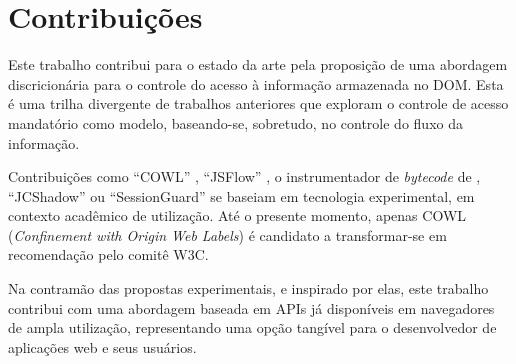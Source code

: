 \section{Contribuições}

Este trabalho contribui para o estado da arte pela proposição de uma abordagem discricionária para o controle do acesso à informação armazenada no DOM. Esta é uma trilha divergente de trabalhos anteriores que exploram o controle de acesso mandatório como modelo, baseando-se, sobretudo, no controle do fluxo da informação.

Contribuições como ``COWL'' \cite{Stefan2014}, ``JSFlow'' \cite{Hedin2016}, o instrumentador de \textit{bytecode} de \cite{Bichhawat2014}, ``JCShadow'' \cite{Patil2011} ou ``SessionGuard'' \cite{Patil2017} se baseiam em tecnologia experimental, em contexto acadêmico de utilização. Até o presente momento, apenas COWL (\textit{Confinement with Origin Web Labels}) é candidato a transformar-se em recomendação pelo comitê W3C\cite{W3C:COWL}.

Na contramão das propostas experimentais, e inspirado por elas, este trabalho contribui com uma abordagem baseada em APIs já disponíveis em navegadores de ampla utilização, representando uma opção tangível para o desenvolvedor de aplicações web e seus usuários.

